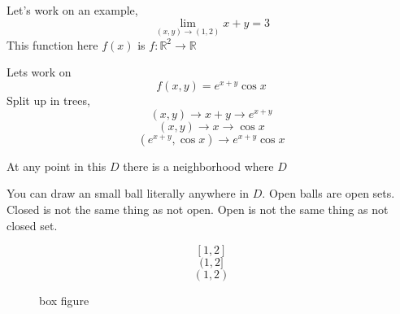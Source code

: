 \documentclass[letter]{article}
\begin{document}
Let's work on an example,
\[
\lim_{(x,y) \to (1,2)} x + y = 3
\] 
This function here $f(x)$ is $f:\mathbb{R}^2\to \mathbb{R}$

Lets work on 
\[
f(x,y) = e^{x+y} \cos x
\]Split up in trees, 
\[
	(x,y) \to  x+y \to  e^{x+y}
\] \[
(x,y) \to x \to \cos x
\] 
\[
	(e^{x+y},\cos x) \to e^{x+y} \cos x
\] 

At any point in this $D$ there is a neighborhood where $D$ 

You can draw an small ball literally anywhere in $D$. Open balls are open sets. 
Closed is not the same thing as not open. 
Open is not the same thing as not closed set. 

\[
	[1,2]
\]
\[
	(1,2]
\] 
\[
	(1,2)
\] 

\begin{figure}[ht]
    \centering
    \caption{box figure}
    \label{fig:box-figure}
\end{figure}
\end{document}
